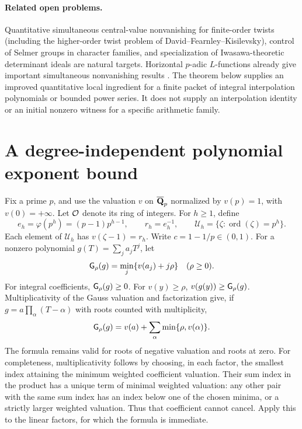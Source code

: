 \documentclass[11pt]{article}
\theoremstyle{remark}\newtheorem{remark}[theorem]{Remark}
\begin{document}
\paragraph{Related open problems.}
Quantitative simultaneous central-value nonvanishing for finite-order
twists (including the higher-order twist problem of David--Fearnley--Kisilevsky),
control of Selmer groups in character families, and specialization of
Iwasawa-theoretic determinant ideals are natural targets. Horizontal
$p$-adic $L$-functions already give important simultaneous nonvanishing
results \cite{KN}. The theorem below supplies an improved quantitative
local ingredient for a finite packet of integral interpolation
polynomials or bounded power series. It does not supply an interpolation
identity or an initial nonzero witness for a specific arithmetic family.

\section{A degree-independent polynomial exponent bound}

Fix a prime $p$, and use the valuation $v$ on $\overline{\mathbf Q}_p$ normalized by
$v(p)=1$, with $v(0)=+\infty$. Let $\mathcal O$ denote its ring of integers.
For $h\ge1$, define
\[
 e_h=\varphi(p^h)=(p-1)p^{h-1},\qquad r_h=e_h^{-1},\qquad
 \mathcal U_h=\{\zeta:\operatorname{ord}(\zeta)=p^h\}.
\]
Each element of $\mathcal U_h$ has $v(\zeta-1)=r_h$. Write
$c=1-1/p\in(0,1)$. For a nonzero polynomial $g(T)=\sum_j a_jT^j$,
let
\[
 \mathsf G_\rho(g)=\min_j\{v(a_j)+j\rho\}\quad (\rho\ge0).
\]
For integral coefficients, $\mathsf G_\rho(g)\ge0$. For $v(y)\ge\rho$,
$v(g(y))\ge\mathsf G_\rho(g)$. Multiplicativity of the Gauss valuation
and factorization give, if $g=a\prod_{\alpha}(T-\alpha)$ with roots
counted with multiplicity,
\begin{equation}\label{eq:gauss}
 \mathsf G_\rho(g)=v(a)+\sum_{\alpha}\min\{\rho,v(\alpha)\}.
\end{equation}
The formula remains valid for roots of negative valuation and roots
at zero. For completeness, multiplicativity follows by choosing, in
each factor, the smallest index attaining the minimum weighted
coefficient valuation. Their sum index in the product has a unique
term of minimal weighted valuation: any other pair with the same sum
index has an index below one of the chosen minima, or a strictly larger
weighted valuation. Thus that coefficient cannot cancel. Apply this to
the linear factors, for which the formula is immediate.
\end{document}
